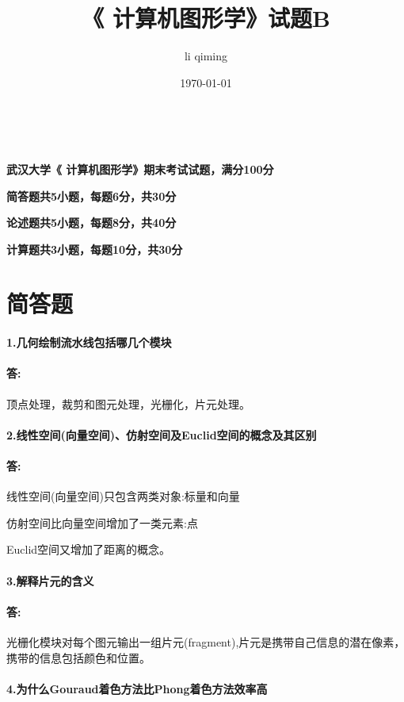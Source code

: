 \documentclass[12pt,a4paper,UTF8]{ctexart}
\title{《 计算机图形学》试题B}
\author{li qiming}
\date{\today}
\begin{document}
	\maketitle
	\tableofcontents  %
	~\\  %
	\begin{center}  %
		\par {\bfseries 武汉大学《 计算机图形学》期末考试试题，满分100分}  %
		\par {\bfseries 简答题共5小题，每题6分，共30分}
		\par {\bfseries 论述题共5小题，每题8分，共40分}
		\par {\bfseries 计算题共3小题，每题10分，共30分}
	\end{center}

	\newpage
	
	\section{简答题}
	\paragraph{1.几何绘制流水线包括哪几个模块}
	\paragraph{答:}顶点处理，裁剪和图元处理，光栅化，片元处理。
	\paragraph{2.线性空间(向量空间)、仿射空间及Euclid空间的概念及其区别}
	\paragraph{答:}线性空间(向量空间)只包含两类对象:标量和向量
	\par 仿射空间比向量空间增加了一类元素:点
	\par Euclid空间又增加了距离的概念。
	\paragraph{3.解释片元的含义}
	\paragraph{答:}光栅化模块对每个图元输出一组片元(fragment),片元是携带自己信息的潜在像素，携带的信息包括颜色和位置。
	\paragraph{4.为什么Gouraud着色方法比Phong着色方法效率高}
\end{document}
